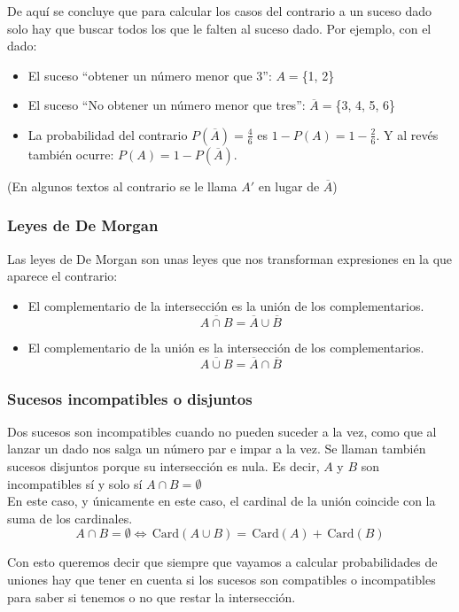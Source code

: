 \documentclass[a4paper,10pt,answers]{exam}
\newcommand{\Card}{\,\mathrm{Card}}
\begin{document}
De aquí se concluye que para calcular los casos del contrario a un suceso dado solo hay que buscar todos los que le falten al suceso dado. Por ejemplo, con el dado:
\begin{itemize}
	\item El suceso ``obtener un número menor que 3'': $A=$\{1, 2\}
	\item El suceso ``No obtener un número menor que tres'': $\overline{A}=$\{3, 4, 5, 6\}
	\item La probabilidad del contrario $P(\overline{A}) = \frac{4}{6}$ es $1-P(A) = 1 -\frac{2}{6}$. Y al revés también ocurre: $P(A) = 1 - P(\overline{A})$.
\end{itemize}
(En algunos textos al contrario se le llama $A'$ en lugar de $\overline{A}$)

\subsubsection{Leyes de De Morgan}
Las leyes de De Morgan son unas leyes que nos transforman expresiones en la que aparece el contrario:
\begin{itemize}
	\item El complementario de la intersección es la unión de los complementarios.
	\[\overline{A \cap B}=\overline{A} \cup \overline{B}\]
	\item El complementario de la unión es la intersección de los complementarios.
	\[\overline{A \cup B}=\overline{A} \cap \overline{B}\]
\end{itemize}

\subsubsection{Sucesos incompatibles o disjuntos}
Dos sucesos son incompatibles cuando no pueden suceder a la vez, como que al lanzar un dado nos salga un número par e impar a la vez.
Se llaman también sucesos disjuntos porque su intersección es nula. Es decir, $A$ y $B$ son incompatibles sí y solo sí $A \cap B = \emptyset$\\

En este caso, y únicamente en este caso, el cardinal de la unión coincide con la suma de los cardinales.
\[
A \cap B = \emptyset \Leftrightarrow \Card (A \cup B ) =\Card(A) + \Card(B)
\]

Con esto queremos decir que siempre que vayamos a calcular probabilidades de uniones hay que tener en cuenta si los sucesos son compatibles o incompatibles para saber si tenemos o no que restar la intersección.
\end{document}
